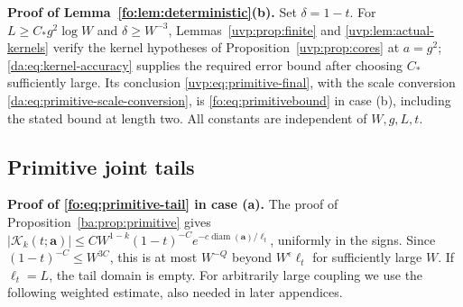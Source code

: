 \documentclass[11pt]{article}
\numberwithin{equation}{section}
\theoremstyle{remark}
\newcommand{\diam}{\operatorname{diam}}
\newcommand{\cK}{\mathcal K}
\begin{document}
\noindent\textbf{Proof of Lemma~\ref{fo:lem:deterministic}(b).}
Set $\delta=1-t$. For $L\ge C_*g^2\log W$ and
$\delta\ge W^{-3}$, Lemmas~\ref{uvp:prop:finite} and
\ref{uvp:lem:actual-kernels} verify the kernel hypotheses of
Proposition~\ref{uvp:prop:cores} at $a=g^2$; \eqref{da:eq:kernel-accuracy} supplies
the required error bound after choosing $C_*$ sufficiently large.
Its conclusion \eqref{uvp:eq:primitive-final}, with the scale conversion
\eqref{da:eq:primitive-scale-conversion}, is
\eqref{fo:eq:primitivebound} in case (b), including the stated bound at length two.
All constants are independent of $W,g,L,t$.

\subsection{Primitive joint tails}\label{app:primitive-tails}
\noindent\textbf{Proof of \eqref{fo:eq:primitive-tail} in case \textup{(a)}.}
The proof of Proposition~\ref{ba:prop:primitive} gives
$|\cK_k(t;\boldsymbol a)|\le C W^{1-k}(1-t)^{-C}
 e^{-c\diam(\boldsymbol a)/\ell_t}$, uniformly in the signs.
Since $(1-t)^{-C}\le W^{3C}$, this is at most $W^{-Q}$ beyond
$W^\epsilon\ell_t$ for sufficiently large $W$. If $\ell_t=L$,
the tail domain is empty. For arbitrarily large coupling we use the
following weighted estimate, also needed in later appendices.
\end{document}
